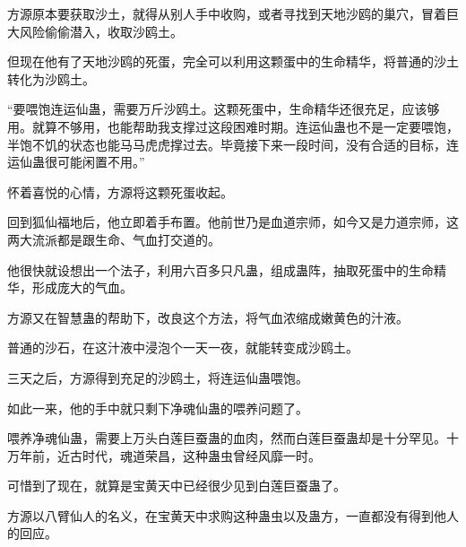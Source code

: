 \begin{this_body}
方源原本要获取沙土，就得从别人手中收购，或者寻找到天地沙鸥的巢穴，冒着巨大风险偷偷潜入，收取沙鸥土。

但现在他有了天地沙鸥的死蛋，完全可以利用这颗蛋中的生命精华，将普通的沙土转化为沙鸥土。

“要喂饱连运仙蛊，需要万斤沙鸥土。这颗死蛋中，生命精华还很充足，应该够用。就算不够用，也能帮助我支撑过这段困难时期。连运仙蛊也不是一定要喂饱，半饱不饥的状态也能马马虎虎撑过去。毕竟接下来一段时间，没有合适的目标，连运仙蛊很可能闲置不用。”

怀着喜悦的心情，方源将这颗死蛋收起。

回到狐仙福地后，他立即着手布置。他前世乃是血道宗师，如今又是力道宗师，这两大流派都是跟生命、气血打交道的。

他很快就设想出一个法子，利用六百多只凡蛊，组成蛊阵，抽取死蛋中的生命精华，形成庞大的气血。

方源又在智慧蛊的帮助下，改良这个方法，将气血浓缩成嫩黄色的汁液。

普通的沙石，在这汁液中浸泡个一天一夜，就能转变成沙鸥土。

三天之后，方源得到充足的沙鸥土，将连运仙蛊喂饱。

如此一来，他的手中就只剩下净魂仙蛊的喂养问题了。

喂养净魂仙蛊，需要上万头白莲巨蚕蛊的血肉，然而白莲巨蚕蛊却是十分罕见。十万年前，近古时代，魂道荣昌，这种蛊虫曾经风靡一时。

可惜到了现在，就算是宝黄天中已经很少见到白莲巨蚕蛊了。

方源以八臂仙人的名义，在宝黄天中求购这种蛊虫以及蛊方，一直都没有得到他人的回应。

\end{this_body}

